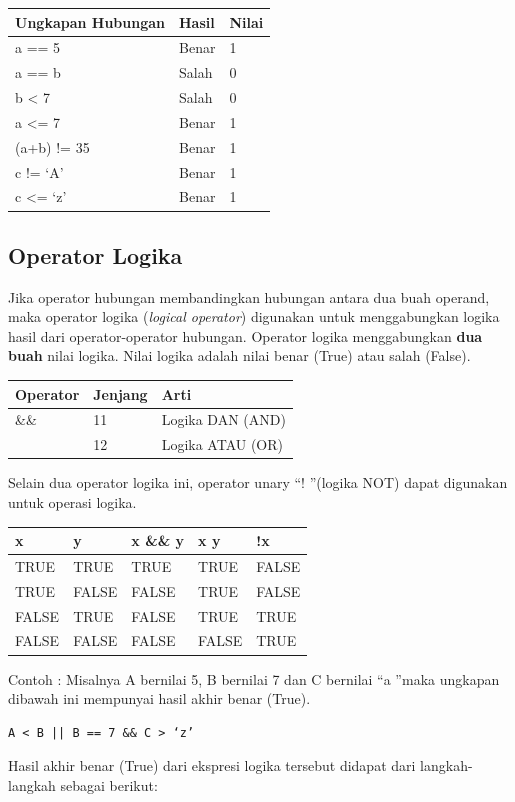 \begin{longtable}[]{@{}lll@{}}
\toprule
Ungkapan Hubungan & Hasil & Nilai\tabularnewline
\midrule
\endhead
a == 5 & Benar & 1\tabularnewline
a == b & Salah & 0\tabularnewline
b \textless{} 7 & Salah & 0\tabularnewline
a \textless{}= 7 & Benar & 1\tabularnewline
(a+b) != 35 & Benar & 1\tabularnewline
c != `A' & Benar & 1\tabularnewline
c \textless{}= `z' & Benar & 1\tabularnewline
\bottomrule
\end{longtable}

\subsection{Operator Logika}\label{f-operator-logika}

Jika operator hubungan membandingkan hubungan antara dua buah operand,
maka operator logika (\emph{logical operator}) digunakan untuk
menggabungkan logika hasil dari operator-operator hubungan. Operator
logika menggabungkan \textbf{dua buah} nilai logika. Nilai logika adalah
nilai benar (True) atau salah (False).

\begin{longtable}[]{@{}lll@{}}
\toprule
Operator & Jenjang & Arti\tabularnewline
\midrule
\endhead
\&\& & 11 & Logika DAN (AND)\tabularnewline
\texttt{\textbar{}\textbar{}} & 12 & Logika ATAU (OR)\tabularnewline
\bottomrule
\end{longtable}

Selain dua operator logika ini, operator unary \textquotedblleft ! \textquotedblright (logika NOT) dapat
digunakan untuk operasi logika.

\begin{longtable}[]{@{}lllll@{}}
\toprule
x & y & x \&\& y & x \texttt{\textbar{}\textbar{}} y & !x\tabularnewline
\midrule
\endhead
TRUE & TRUE & TRUE & TRUE & FALSE\tabularnewline
TRUE & FALSE & FALSE & TRUE & FALSE\tabularnewline
FALSE & TRUE & FALSE & TRUE & TRUE\tabularnewline
FALSE & FALSE & FALSE & FALSE & TRUE\tabularnewline
\bottomrule
\end{longtable}

Contoh : Misalnya A bernilai 5, B bernilai 7 dan C bernilai \textquotedblleft a \textquotedblright maka
ungkapan dibawah ini mempunyai hasil akhir benar (True).

\begin{verbatim}
A < B || B == 7 && C > ‘z’
\end{verbatim}

Hasil akhir benar (True) dari ekspresi logika tersebut didapat dari
langkah-langkah sebagai berikut:

